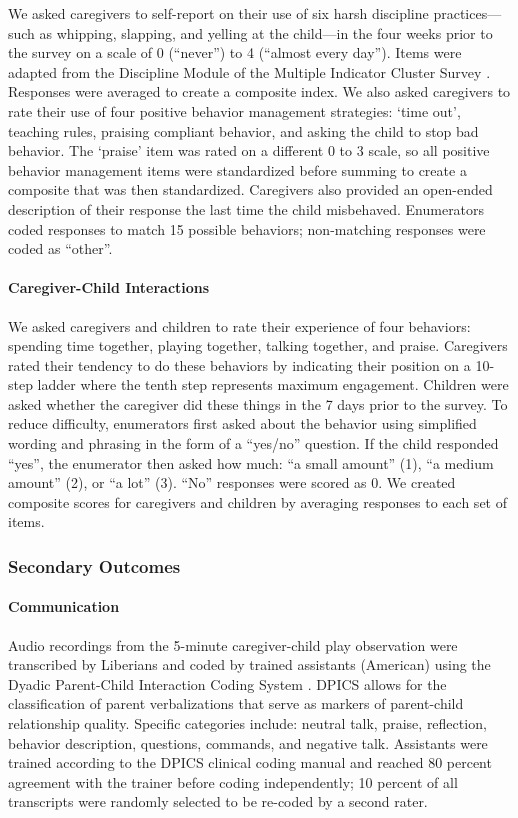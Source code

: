 \documentclass[12pt,authoryear]{elsarticle}\usepackage{knitr}
\begin{document}
We asked caregivers to self-report on their use of six harsh discipline practices---such as whipping, slapping, and yelling at the child---in the four weeks prior to the survey on a scale of 0 (``never'') to 4 (``almost every day''). Items were adapted from the Discipline Module of the Multiple Indicator Cluster Survey \citep{unicef:2005}. Responses were averaged to create a composite index. We also asked caregivers to rate their use of four positive behavior management strategies: `time out', teaching rules, praising compliant behavior, and asking the child to stop bad behavior. The `praise' item was rated on a different 0 to 3 scale, so all positive behavior management items were standardized before summing to create a composite that was then standardized. Caregivers also provided an open-ended description of their response the last time the child misbehaved. Enumerators coded responses to match 15 possible behaviors; non-matching responses were coded as ``other''. 

\paragraph*{Caregiver-Child Interactions}

We asked caregivers and children to rate their experience of four behaviors: spending time together, playing together, talking together, and praise. Caregivers rated their tendency to do these behaviors by indicating their position on a 10-step ladder where the tenth step represents maximum engagement. Children were asked whether the caregiver did these things in the 7 days prior to the survey. To reduce difficulty, enumerators first asked about the behavior using simplified wording and phrasing in the form of a ``yes/no'' question. If the child responded ``yes'', the enumerator then asked how much: ``a small amount'' (1), ``a medium amount'' (2), or ``a lot'' (3). ``No'' responses were scored as 0. We created composite scores for caregivers and children by averaging responses to each set of items.

\subsubsection*{Secondary Outcomes}

\paragraph*{Communication}

Audio recordings from the 5-minute caregiver-child play observation were transcribed by Liberians and coded by trained assistants (American) using the Dyadic Parent-Child Interaction Coding System \citep[DPICS-III;][]{Eyberg:2005}. DPICS allows for the classification of parent verbalizations that serve as markers of parent-child relationship quality. Specific categories include: neutral talk, praise, reflection, behavior description, questions, commands, and negative talk. Assistants were trained according to the DPICS clinical coding manual \citep{Chase:2005,Fernandez:2005} and reached 80 percent agreement with the trainer before coding independently; 10 percent of all transcripts were randomly selected to be re-coded by a second rater. 
\end{document}
